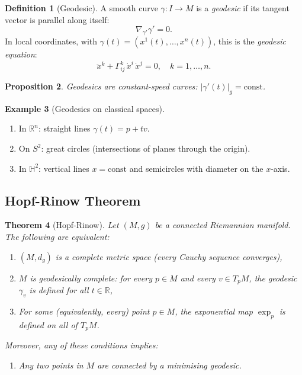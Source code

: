\documentclass[12pt,a4paper]{amsart}
\newtheorem{theorem}{Theorem}[section]
\newtheorem{proposition}[theorem]{Proposition}
\theoremstyle{definition}
\newtheorem{definition}[theorem]{Definition}
\newtheorem{example}[theorem]{Example}
\begin{document}
\begin{definition}[Geodesic]
A smooth curve $\gamma: I \to M$ is a \emph{geodesic} if its tangent vector
is parallel along itself:
\[
  \nabla_{\gamma'}\gamma' = 0.
\]
In local coordinates, with $\gamma(t) = (x^1(t), \ldots, x^n(t))$, this
is the \emph{geodesic equation}:
\[
  \ddot{x}^k + \Gamma^k_{ij}\,\dot{x}^i\,\dot{x}^j = 0,
  \quad k = 1, \ldots, n.
\]
\end{definition}

\begin{proposition}
Geodesics are constant-speed curves: $|\gamma'(t)|_g = \text{const}$.
\end{proposition}

\begin{example}[Geodesics on classical spaces]
\begin{enumerate}[label=(\alph*)]
  \item In $\mathbb{R}^n$: straight lines $\gamma(t) = p + tv$.
  \item On $S^2$: great circles (intersections of planes through the origin).
  \item In $\mathbb{H}^2$: vertical lines $x = \text{const}$ and semicircles
        with diameter on the $x$-axis.
\end{enumerate}
\end{example}

\subsection{Hopf-Rinow Theorem}

\begin{theorem}[Hopf-Rinow]
\label{thm:hopf-rinow}
Let $(M, g)$ be a connected Riemannian manifold. The following are equivalent:
\begin{enumerate}[label=(\roman*)]
  \item $(M, d_g)$ is a complete metric space (every Cauchy sequence converges),
  \item $M$ is \emph{geodesically complete}: for every $p \in M$ and every
        $v \in T_pM$, the geodesic $\gamma_v$ is defined for all $t \in \mathbb{R}$,
  \item For some (equivalently, every) point $p \in M$, the exponential map
        $\exp_p$ is defined on all of $T_pM$.
\end{enumerate}
Moreover, any of these conditions implies:
\begin{enumerate}[label=(\alph*)]
  \item Any two points in $M$ are connected by a minimising geodesic.
\end{enumerate}
\end{theorem}
\end{document}
